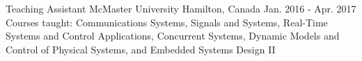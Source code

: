 \begin{cventries}
  \cventry
    {Teaching Assistant} %
    {McMaster University} %
    {Hamilton, Canada} %
    {Jan. 2016 - Apr. 2017} %
    {Courses taught: Communications Systems, Signals and Systems, Real-Time Systems and Control Applications, Concurrent Systems, Dynamic Models and Control of Physical Systems, and Embedded Systems Design II
    }





\end{cventries}
